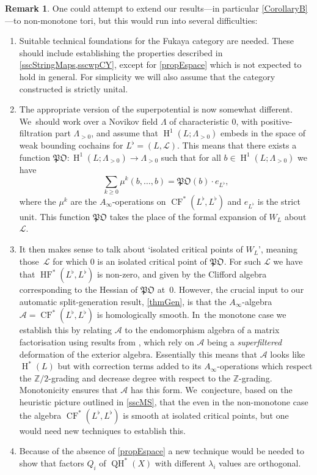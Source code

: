 \documentclass[JEP,XML,SOM,Unicode,NoEqCountersInSection,NoFloatCountersInSection,published]{cedram}
\theoremstyle{definition}
\newtheorem{remark}[theorem]{Remark}
\newcommand{\ZZ}{\mathbb{Z}}
\newcommand{\LL}{L^\flat}
\newcommand{\calA}{\mathcal{A}}
\newcommand{\calL}{\mathcal{L}}
\newcommand{\rH}{\operatorname{H}}
\newcommand{\HF}{\operatorname{HF}}
\newcommand{\CF}{\operatorname{CF}}
\newcommand{\QH}{\operatorname{QH}}
\begin{document}
\begin{remark}
One could attempt to extend our results---in particular \cref{CorollaryB}---to non-monotone tori, but this would run into several difficulties:
\begin{enumerate}
\item Suitable technical foundations for the Fukaya category are needed. These should include establishing the properties described in \cref{sscStringMaps,sscwpCY}, except for \cref{propEspace} which is not expected to hold in general. For simplicity we will also assume that the category constructed is strictly unital.
\item The appropriate version of the superpotential is now somewhat different. We~should work over a Novikov field $\Lambda$ of characteristic $0$, with positive-filtration part $\Lambda_{>0}$, and assume that $\rH^1(L; \Lambda_{>0})$ embeds in the space of weak bounding cochains for $\LL = (L, \calL)$. This means that there exists a function $\mathfrak{PO} : \rH^1(L; \Lambda_{>0}) \to \Lambda_{>0}$ such that for all $b \in \rH^1(L; \Lambda_{>0})$ we have
\[
\sum_{k \geq 0} \mu^k(b, \dots, b) = \mathfrak{PO}(b) \cdot e_{\LL},
\]
where the $\mu^k$ are the $A_\infty$-operations on $\CF^*(\LL, \LL)$ and $e_{\LL}$ is the strict unit. This function $\mathfrak{PO}$ takes the place of the formal expansion of $W_L$ about $\calL$.
\item It then makes sense to talk about `isolated critical points of $W_L$', meaning those~$\calL$ for which $0$ is an isolated critical point of $\mathfrak{PO}$. For such $\calL$ we have that $\HF^*(\LL, \LL)$ is non-zero, and given by the Clifford algebra corresponding to the Hessian of $\mathfrak{PO}$ at~$0$. However, the crucial input to our automatic split-generation result, \cref{thmGen}, is that the $A_\infty$-algebra $\calA = \CF^*(\LL, \LL)$ is homologically smooth. In~the monotone case we establish this by relating $\calA$ to the endomorphism algebra of a matrix factorisation using results from \cite{SmithSuperfiltered}, which rely on $\calA$ being a \emph{superfiltered} deformation of the exterior algebra. Essentially this means that $\calA$ looks like $\rH^*(L)$ but with correction terms added to its $A_\infty$-operations which respect the $\ZZ/2$-grading and decrease degree with respect to the $\ZZ$-grading. Monotonicity ensures that $\calA$ has this form. We~conjecture, based on the heuristic picture outlined in \cref{sscMS}, that the even in the non-monotone case the algebra $\CF^*(\LL, \LL)$ is smooth at isolated critical points, but one would need new techniques to establish this.
\item Because of the absence of \cref{propEspace} a new technique would be needed to show that factors $Q_i$ of $\QH^*(X)$ with different $\lambda_i$ values are orthogonal.
\end{enumerate}
\end{remark}
\end{document}
